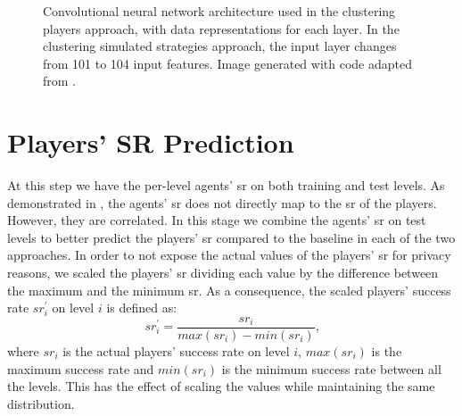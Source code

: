 \begin{figure}
    \centering
    
%    
    \caption{Convolutional neural network architecture used in the clustering players approach, with data representations for each layer. In the clustering simulated strategies approach, the input layer changes from 101 to 104 input features. Image generated with code adapted from \cite{eisen_simulating_2017}.} 
    \label{fig:network_architecture}
\end{figure}


\section{Players' SR Prediction}
At this step we have the per-level agents' \acs{sr} on both training and test levels. As demonstrated in \cite{eisen_simulating_2017}, the agents' \acs{sr} does not directly map to the \acs{sr} of the players. However, they are correlated. In this stage we combine the agents' \acs{sr} on test levels to better predict the players' \acs{sr} compared to the baseline in each of the two approaches. In order to not expose the actual values of the players' \acs{sr} for privacy reasons, we scaled the players' \acs{sr} dividing each value by the difference between the maximum and the minimum \acs{sr}.
As a consequence, the scaled players' success rate $sr_i^\prime$ on level $i$ is defined as:
\begin{equation}\label{eq:scaled_sr}
    sr_i^\prime = \frac{sr_i}{max(sr_i) - min(sr_i)} \text{,}
\end{equation}
where $sr_i$ is the actual players' success rate on level $i$, $max(sr_i)$ is the maximum success rate and $min(sr_i)$ is the minimum success rate between all the levels. This has the effect of scaling the values while maintaining the same distribution.
